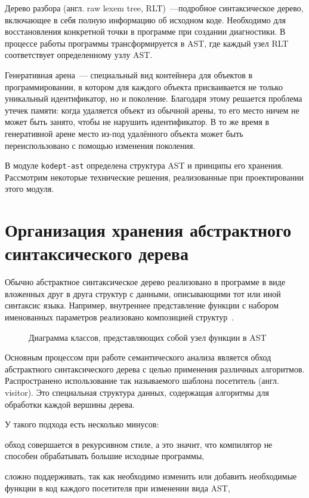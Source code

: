 Дерево разбора (англ. raw lexem tree, RLT)~---подробное синтаксическое дерево, включающее в себя полную информацию об исходном коде.
Необходимо для восстановления конкретной точки в программе при создании диагностики.
В процессе работы программы трансформируется в AST, где каждый узел RLT соответствует определенному узлу AST.

Генеративная арена~--- специальный вид контейнера для объектов в программировании, в котором для каждого объекта присваивается не только уникальный идентификатор, но и поколение.
Благодаря этому решается проблема утечек памяти: когда удаляется объект из обычной арены, то его место ничем не может быть занято, чтобы не нарушить идентификатор.
В то же время в генеративной арене место из-под удалённого объекта может быть переиспользовано с помощью изменения поколения.

В модуле \lstinline{kodept-ast} определена структура AST и принципы его хранения.
Рассмотрим некоторые технические решения, реализованные при проектировании этого модуля.


\section{Организация хранения абстрактного синтаксического дерева}
\label{sec:ast_structure}

Обычно абстрактное синтаксическое дерево реализовано в программе в виде вложенных друг в друга структур с данными, описывающими тот или иной синтаксис языка.
Например, внутреннее представление функции с набором именованных параметров реализовано композицией структур~.

\begin{figure}[H]
    \centering
    
    \caption{Диаграмма классов, представляющих собой узел функции в AST}
    \label{fig:func_AST}
\end{figure}

Основным процессом при работе семантического анализа является обход абстрактного синтаксического дерева с целью применения различных алгоритмов.
Распространено использование так называемого шаблона посетитель (англ. visitor).
Это специальная структура данных, содержащая алгоритмы для обработки каждой вершины дерева.

У такого подхода есть несколько минусов:
\begin{inparaenum}[1)]
    \item обход совершается в рекурсивном стиле, а это значит, что компилятор не способен обрабатывать большие исходные программы,
    \item сложно поддерживать, так как необходимо изменить или добавить необходимые функции в код каждого посетителя при изменении вида AST,
\end{inparaenum}

